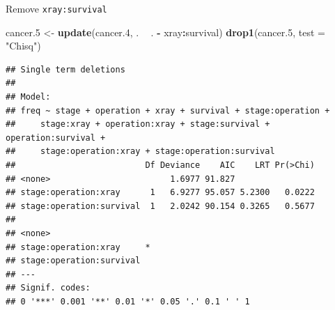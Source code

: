 \documentclass[ignorenonframetext,]{beamer}
\newenvironment{Shaded}{\begin{snugshade}}{\end{snugshade}}
\newcommand{\DataTypeTok}[1]{\textcolor[rgb]{0.13,0.29,0.53}{#1}}
\newcommand{\FloatTok}[1]{\textcolor[rgb]{0.00,0.00,0.81}{#1}}
\newcommand{\KeywordTok}[1]{\textcolor[rgb]{0.13,0.29,0.53}{\textbf{#1}}}
\newcommand{\NormalTok}[1]{#1}
\newcommand{\OperatorTok}[1]{\textcolor[rgb]{0.81,0.36,0.00}{\textbf{#1}}}
\newcommand{\StringTok}[1]{\textcolor[rgb]{0.31,0.60,0.02}{#1}}
\begin{document}
\begin{frame}[fragile]{Remove \texttt{xray:survival}}
\protect\hypertarget{remove-xraysurvival}{}

\begin{Shaded}
\begin{Highlighting}[]
\NormalTok{cancer}\FloatTok{.5}\NormalTok{ <-}\StringTok{ }\KeywordTok{update}\NormalTok{(cancer}\FloatTok{.4}\NormalTok{, . }\OperatorTok{~}\StringTok{ }\NormalTok{. }\OperatorTok{-}\StringTok{ }\NormalTok{xray}\OperatorTok{:}\NormalTok{survival)}
\KeywordTok{drop1}\NormalTok{(cancer}\FloatTok{.5}\NormalTok{, }\DataTypeTok{test =} \StringTok{"Chisq"}\NormalTok{)}
\end{Highlighting}
\end{Shaded}

\begin{verbatim}
## Single term deletions
## 
## Model:
## freq ~ stage + operation + xray + survival + stage:operation + 
##     stage:xray + operation:xray + stage:survival + operation:survival + 
##     stage:operation:xray + stage:operation:survival
##                          Df Deviance    AIC    LRT Pr(>Chi)
## <none>                        1.6977 91.827                
## stage:operation:xray      1   6.9277 95.057 5.2300   0.0222
## stage:operation:survival  1   2.0242 90.154 0.3265   0.5677
##                           
## <none>                    
## stage:operation:xray     *
## stage:operation:survival  
## ---
## Signif. codes:  
## 0 '***' 0.001 '**' 0.01 '*' 0.05 '.' 0.1 ' ' 1
\end{verbatim}

\end{frame}
\end{document}
